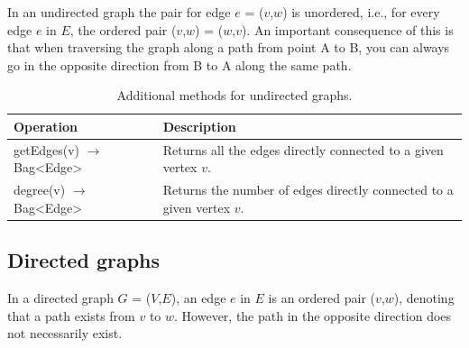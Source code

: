 In an undirected graph the pair for edge $e$ = ($v$,$w$) is unordered, i.e., for every edge $e$ in $E$, the ordered pair ($v$,$w$) = ($w$,$v$). An important consequence of this is that when traversing the graph along a path from point A to B, you can always go in the opposite direction from B to A along the same path.

\begin{table}[H]
	\caption{Additional methods for undirected graphs.}
	\label{tab:api:graph-undirected}
	\begin{tabular}{p{150px} | p{250px}}
		\textbf{Operation} & \textbf{Description} \\
		\hline
		getEdges(v) $\rightarrow$ Bag<Edge> & Returns all the edges directly connected to a given vertex $v$. \\
		degree(v) $\rightarrow$ Bag<Edge> & Returns the number of edges directly connected to a given vertex $v$. \\
		\hline
	\end{tabular}
\end{table}



\subsection{Directed graphs}

In a directed graph $G$ = ($V$,$E$), an edge $e$ in $E$ is an ordered pair ($v$,$w$), denoting that a path exists from $v$ to $w$. However, the path in the opposite direction does not necessarily exist.








